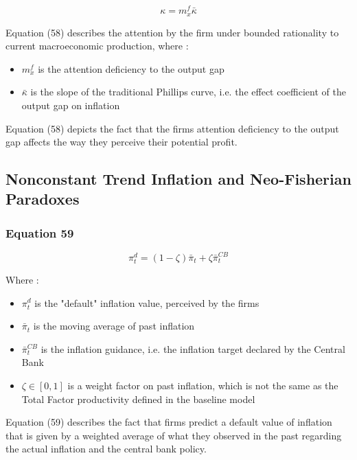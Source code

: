 \documentclass{article}
\begin{document}
\begin{equation}\tag{58}
    \kappa = m^{f}_{x}\bar{\kappa}
\end{equation}

Equation (58) describes the attention by the firm under bounded rationality to current macroeconomic production, where : 
\begin{itemize}
    \item $m^{f}_{x}$ is the attention deficiency to the output gap
    \item $\bar{\kappa}$ is the slope of the traditional Phillips curve, i.e. the effect coefficient of the output gap on inflation
\end{itemize}

Equation (58) depicts the fact that the firms attention deficiency to the output gap affects the way they perceive their potential profit.

\subsection{Nonconstant Trend Inflation and Neo-Fisherian Paradoxes}

\subsubsection*{Equation 59}

\begin{equation}\tag{59}
    \pi^{d}_{t}=(1-\zeta)\bar{\pi}_{t}+\zeta\bar{\pi}_{t}^{CB}
\end{equation}

Where : 
\begin{itemize}
    \item $\pi^{d}_{t}$ is the "default" inflation value, perceived by the firms
    \item $\bar{\pi}_{t}$ is the moving average of past inflation 
    \item $\bar{\pi}_{t}^{CB}$ is the inflation guidance, i.e. the inflation target declared by the Central Bank
    \item $\zeta\in\left[0,1\right]$ is a weight factor on past inflation, which is not the same as the Total Factor productivity defined in the baseline model
\end{itemize}

Equation (59) describes the fact that firms predict a default value of inflation that is given by a weighted average of what they observed in the past regarding the actual inflation and the central bank policy. 
\end{document}

